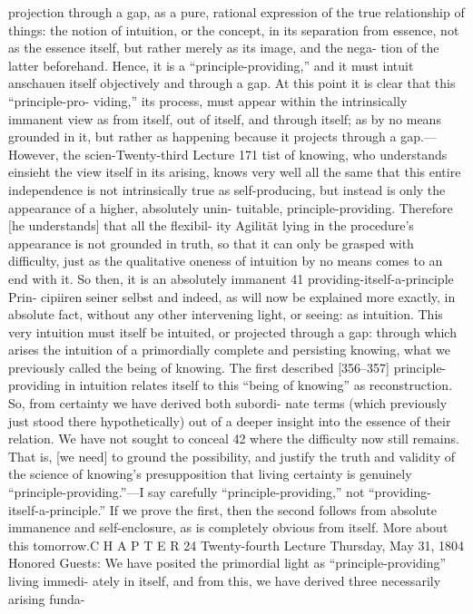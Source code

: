 projection through a gap, as a pure, rational expression of the true relationship
of things: the notion of intuition, or the concept, in its separation from
essence, not as the essence itself, but rather merely as its image, and the nega-
tion of the latter beforehand.
Hence, it is a “principle-providing,” and it must intuit {anschauen} itself
objectively and through a gap. At this point it is clear that this “principle-pro-
viding,” its process, must appear within the intrinsically immanent view as
from itself, out of itself, and through itself; as by no means grounded in it, but
rather as happening because it projects through a gap.—However, the scien-Twenty-third Lecture
171
tist of knowing, who understands {einsieht} the view itself in its arising, knows
very well all the same that this entire independence is not intrinsically true as
self-producing, but instead is only the appearance of a higher, absolutely unin-
tuitable, principle-providing. Therefore [he understands] that all the flexibil-
ity {Agilität} lying in the procedure’s appearance is not grounded in truth, so
that it can only be grasped with difficulty, just as the qualitative oneness of
intuition by no means comes to an end with it.
So then, it is an absolutely immanent 41 providing-itself-a-principle {Prin-
cipiiren seiner selbst} and indeed, as will now be explained more exactly, in
absolute fact, without any other intervening light, or seeing: as intuition. This
very intuition must itself be intuited, or projected through a gap: through
which arises the intuition of a primordially complete and persisting knowing,
what we previously called the being of knowing. The first described
[356–357] principle-providing in intuition relates itself to this “being of
knowing” as reconstruction. So, from certainty we have derived both subordi-
nate terms (which previously just stood there hypothetically) out of a deeper
insight into the essence of their relation.
We have not sought to conceal 42 where the difficulty now still remains.
That is, [we need] to ground the possibility, and justify the truth and validity
of the science of knowing’s presupposition that living certainty is genuinely
“principle-providing.”—I say carefully “principle-providing,” not “providing-
itself-a-principle.” If we prove the first, then the second follows from absolute
immanence and self-enclosure, as is completely obvious from itself. More
about this tomorrow.C H A P T E R
24
Twenty-fourth Lecture
Thursday, May 31, 1804
Honored Guests:
We have posited the primordial light as “principle-providing” living immedi-
ately in itself, and from this, we have derived three necessarily arising funda-
